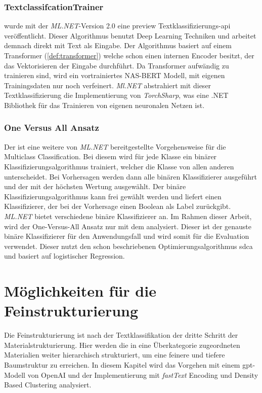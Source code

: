 \subsubsection{TextclassifcationTrainer}
\label{c:conception:classification:multiclass:textclassification}
\citeyear{mlnet_textclassification2022} wurde mit der \textit{ML.NET}-Version 2.0 eine preview Textklassifizierungs-\ac{api} veröffentlicht. Dieser Algorithmus benutzt Deep Learning Techniken und arbeitet demnach direkt mit Text als Eingabe. Der Algorithmus basiert auf einem Transformer (\autoref{def:transformer}) welche schon einen internen Encoder besitzt, der das Vektorisieren der Eingabe durchführt. Da Transformer aufwändig zu trainieren sind, wird ein vortrainiertes NAS-BERT Modell, mit eigenen Trainingsdaten nur noch verfeinert. \textit{Ml.NET} abstrahiert mit dieser Textklassifizierung die Implementierung von \textit{TorchSharp}, was eine .NET Bibliothek für das Trainieren von eigenen neuronalen Netzen ist. \citep[vgl.][]{mlnet_textclassification2022}
\subsubsection{One Versus All Ansatz}
\label{c:conception:classification:multiclass:onevsall}
Der  ist eine weitere von \textit{ML.NET} bereitgestellte Vorgehensweise für die Multiclass Classification. Bei diesem wird für jede Klasse ein binärer Klassifizierungsalgorithmus trainiert, welcher die Klasse von allen anderen unterscheidet. Bei Vorhersagen werden dann alle binären Klassifizierer ausgeführt und der mit der höchsten Wertung ausgewählt. Der binäre Klassifizierungsalgorithmus kann frei gewählt werden und liefert einen Klassifizierer, der bei der Vorhersage einen Boolean als Label zurückgibt. \citep[vgl.][]{oneversusall_doc} \textit{ML.NET} bietet verschiedene binäre Klassifizierer an. Im Rahmen dieser Arbeit, wird der One-Versus-All Ansatz nur mit dem  analysiert. Dieser ist der genauste binäre Klassifizierer für den Anwendungsfall und wird somit für die Evaluation verwendet. Dieser nutzt den schon beschriebenen Optimierungsalgorithmus \ac{sdca} und basiert auf logistischer Regression. \citep[vgl.][]{scdabinary_doc}

\section{Möglichkeiten für die Feinstrukturierung}
\label{c:conception:fine-structuring}
Die Feinstrukturierung ist nach der Textklassifikation der dritte Schritt der Materialstrukturierung. Hier werden die in eine Überkategorie zugeordneten Materialien weiter hierarchisch strukturiert, um eine feinere und tiefere Baumstruktur zu erreichen. In diesem Kapitel wird das Vorgehen mit einem \ac{gpt}-Modell von OpenAI und der Implementierung mit \textit{fastText} Encoding und Density Based Clustering analysiert.

